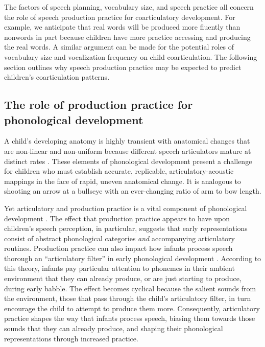 \documentclass[a4paper,man,natbib,donotrepeattitle, apacite]{apa6}
\begin{document}
The factors of speech planning, vocabulary size, and speech practice all concern the role of speech production practice for coarticulatory development. For example, we anticipate that real words will be produced more fluently than nonwords in part because children have more practice accessing and producing the real words. A similar argument can be made for the potential roles of vocabulary size and vocalization frequency on child coarticulation. The following section outlines why speech production practice may be expected to predict children’s coarticulation patterns. 

\subsection{The role of production practice for phonological development}

A child’s developing anatomy is highly transient with anatomical changes that are non-linear \cite{vorperianDevelopmentVocalTract2005} and non-uniform because different speech articulators mature at distinct rates \cite{nittrouerEmergenceMatureGestural1993}. These elements of phonological development present a challenge for children who must establish accurate, replicable, articulatory-acoustic mappings in the face of rapid, uneven anatomical change. It is analogous to shooting an arrow at a bullseye with an ever-changing ratio of arm to bow length. 

Yet articulatory and production practice is a vital component of phonological development \cite{brudererSensorimotorInfluencesSpeech2015,davisEmergenceDiscretePerceptualMotor2019,keren-portnoyRoleVocalPractice2010,mcallisterbyunMotorInfluencesGrammar2016,mennChallengesTheoriesCharges2013,vihmanLearningWordsLearning2017,zamunerReverseProductionEffect2018}. The effect that production practice appears to have upon children's speech perception, in particular, suggests that early representations consist of abstract phonological categories \textit{and} accompanying articulatory routines. Production practice can also impact how infants process speech thorough an ``articulatory filter'' in early phonological development \cite{depaolisProductionPatternsInfluence2011,depaolisInfluenceBabblingPatterns2013,laingBabbleWordsInfants2020,vihmanVariablePathsEarly1993,vihmanLearningWordsLearning2017}. According to this theory, infants pay particular attention to phonemes in their ambient environment that they can already produce, or are just starting to produce, during early babble. The effect becomes cyclical because the salient sounds from the environment, those that pass through the child's articulatory filter, in turn encourage the child to attempt to produce them more. Consequently, articulatory practice shapes the way that infants process speech, biasing them towards those sounds that they can already produce, and shaping their phonological representations through increased practice. 
\end{document}

